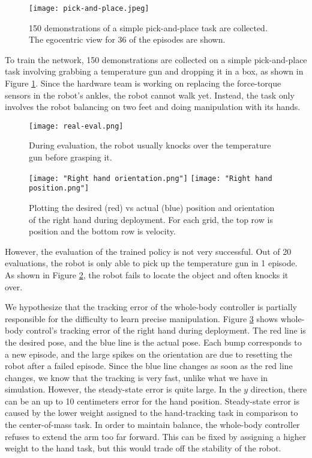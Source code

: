 \begin{figure}
	\centering
	\texttt{[image: pick-and-place.jpeg]}
    \caption{150 demonstrations of a simple pick-and-place task are collected. The egocentric view for 36 of the episodes are shown. }
    \label{fig:pick-and-place}
\end{figure}

To train the network, 150 demonstrations are collected on a simple pick-and-place task involving grabbing a temperature gun and dropping it in a box, as shown in Figure \ref{fig:pick-and-place}. Since the hardware team is working on replacing the force-torque sensors in the robot's ankles, the robot cannot walk yet. Instead, the task only involves the robot balancing on two feet and doing manipulation with its hands. 

\begin{figure}
	\centering
	\texttt{[image: real-eval.png]}
    \caption{During evaluation, the robot usually knocks over the temperature gun before grasping it.}
    \label{fig:real-eval}
\end{figure}
\begin{figure}
	\centering
	\texttt{[image: "Right hand orientation.png"]}
	\texttt{[image: "Right hand position.png"]}
    \caption{Plotting the desired (red) vs actual (blue) position and orientation of the right hand during deployment. For each grid, the top row is position and the bottom row is velocity.}
    \label{fig:tracking-plot}
\end{figure}


However, the evaluation of the trained policy is not very successful. Out of 20 evaluations, the robot is only able to pick up the temperature gun in 1 episode. As shown in Figure \ref{fig:real-eval}, the robot fails to locate the object and often knocks it over. 

We hypothesize that the tracking error of the whole-body controller is partially responsible for the difficulty to learn precise manipulation. Figure \ref{fig:tracking-plot} shows whole-body control's tracking error of the right hand during deployment. The red line is the desired pose, and the blue line is the actual pose. Each bump corresponds to a new episode, and the large spikes on the orientation are due to resetting the robot after a failed episode. Since the blue line changes as soon as the red line changes, we know that the tracking is very fast, unlike what we have in simulation. However, the steady-state error is quite large. In the $y$ direction, there can be an up to 10 centimeters error for the hand position. Steady-state error is caused by the lower weight assigned to the hand-tracking task in comparison to the center-of-mass task. In order to maintain balance, the whole-body controller refuses to extend the arm too far forward. This can be fixed by assigning a higher weight to the hand task, but this would trade off the stability of the robot. 

